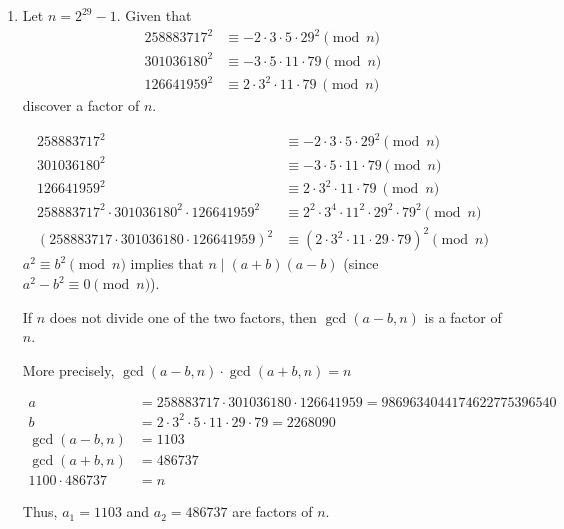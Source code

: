 \begin{problem}
\begin{enumerate}
    \item Let $n=2^{29}-1$.  Given that
    \begin{align*} 
      258883717^2 &\equiv -2\cdot 3 \cdot 5 \cdot 29^2  {} \pmod n \\
      301036180^2 &\equiv -3\cdot 5 \cdot 11 \cdot 79   {} \pmod{n} \\
      126641959^2 &\equiv 2 \cdot 3^2 \cdot 11 \cdot 79 {~} \pmod n
    \end{align*}
    discover a factor of $n$.
    \bigskip
    \begin{Answer}
      \begin{align*}
        258883717^2 &\equiv -2\cdot 3 \cdot 5 \cdot 29^2  {} \pmod n \\
        301036180^2 &\equiv -3\cdot 5 \cdot 11 \cdot 79   {} \pmod{n} \\
        126641959^2 &\equiv 2 \cdot 3^2 \cdot 11 \cdot 79 {~} \pmod n\\
        258883717^2 \cdot 301036180^2 \cdot 126641959^2 &\equiv 2^2 \cdot 3^4 \cdot 11^2 \cdot 29^2 \cdot 79^2 \pmod n\\
        {(258883717 \cdot 301036180 \cdot 126641959)}^2 &\equiv {(2 \cdot 3^2 \cdot 11 \cdot 29 \cdot 79)}^2 \pmod n
      \end{align*}
      $a^2 \equiv b^2 \pmod n$ implies that $n\; |\; (a+b)(a-b)$ (since $a^2 - b^2 \equiv 0 \pmod n$).

      \noindent
      If $n$ does not divide one of the two factors, then $\gcd(a-b, n)$ is a factor of $n$.

      \noindent
      More precisely, $\gcd(a-b, n) \cdot \gcd(a+b, n) = n$

      \begin{align*}
        a &= 258883717 \cdot 301036180 \cdot 126641959 = 9869634044174622775396540\\
        b &= 2 \cdot 3^2 \cdot 5\cdot 11 \cdot 29 \cdot 79 = 2268090\\
        \gcd(a-b, n) &= 1103\\
        \gcd(a+b, n) &= 486737\\
        1100 \cdot 486737 &= n
      \end{align*}

      \noindent
      Thus, $a_1 = 1103$ and $a_2 = 486737$ are factors of $n$.  
    \end{Answer}
  \end{enumerate}
\end{problem}
